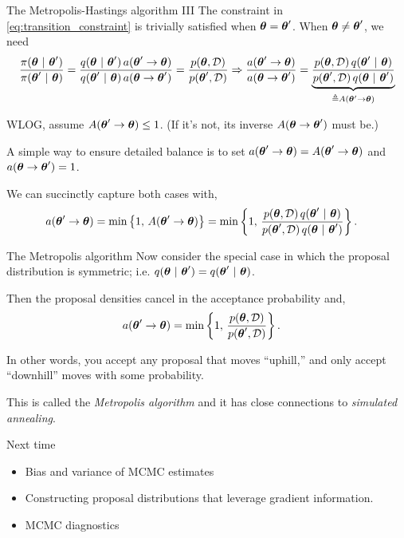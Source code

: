 \documentclass[aspectratio=169]{beamer}
\begin{document}
\begin{frame}{The Metropolis-Hastings algorithm III}
The constraint in \eqref{eq:transition_constraint} is trivially satisfied when $\boldsymbol{\theta} = \boldsymbol{\theta}'$. When $\boldsymbol{\theta} \neq \boldsymbol{\theta}'$, we need
\begin{multline}
    \frac{\pi(\boldsymbol{\theta} ~\vert~ \boldsymbol{\theta}')}{\pi(\boldsymbol{\theta}' ~\vert~ \boldsymbol{\theta})}
    = 
    \frac{q(\boldsymbol{\theta} ~\vert~ \boldsymbol{\theta}') \, a(\boldsymbol{\theta}' \to \boldsymbol{\theta})}{q(\boldsymbol{\theta}' ~\vert~ \boldsymbol{\theta}) \, a(\boldsymbol{\theta} \to \boldsymbol{\theta}')}
    = 
    \frac{p(\boldsymbol{\theta}, \mathcal{D})}{p(\boldsymbol{\theta}',  \mathcal{D})}
    \Rightarrow
    \frac{a(\boldsymbol{\theta}' \to \boldsymbol{\theta})}{a(\boldsymbol{\theta} \to \boldsymbol{\theta}')}
    = 
    \underbrace{\frac{p(\boldsymbol{\theta}, \mathcal{D}) \, q(\boldsymbol{\theta}' ~\vert~ \boldsymbol{\theta})}{p(\boldsymbol{\theta}',  \mathcal{D}) \, q(\boldsymbol{\theta} ~\vert~ \boldsymbol{\theta}') }}_{\triangleq A(\boldsymbol{\theta}' \to \boldsymbol{\theta})}
\end{multline}

WLOG, assume $ A(\boldsymbol{\theta}' \to \boldsymbol{\theta}) \leq 1$. (If it's not, its inverse $A(\boldsymbol{\theta} \to \boldsymbol{\theta}')$ must be.) 

A simple way to ensure detailed balance is to set $a(\boldsymbol{\theta}' \to \boldsymbol{\theta}) = A(\boldsymbol{\theta}' \to \boldsymbol{\theta})$ and $a(\boldsymbol{\theta} \to \boldsymbol{\theta}') = 1$. 

We can succinctly capture both cases with,
\begin{align}
    a(\boldsymbol{\theta}' \to \boldsymbol{\theta}) &= 
    \min \left\{1, \, A(\boldsymbol{\theta}' \to \boldsymbol{\theta}) \right \} = 
    \min \left\{1, \, \frac{p(\boldsymbol{\theta}, \mathcal{D}) \, q(\boldsymbol{\theta}' ~\vert~ \boldsymbol{\theta})}{p(\boldsymbol{\theta}',  \mathcal{D}) \, q(\boldsymbol{\theta} ~\vert~ \boldsymbol{\theta}')} \right \}.
\end{align}

\end{frame} 

\begin{frame}{The Metropolis algorithm}
    Now consider the special case in which the proposal distribution is symmetric; i.e. $q(\boldsymbol{\theta} ~\vert~ \boldsymbol{\theta}') = q(\boldsymbol{\theta}' ~\vert~ \boldsymbol{\theta})$.
    
    Then the proposal densities cancel in the acceptance probability and,
    \begin{align}
    a(\boldsymbol{\theta}' \to \boldsymbol{\theta}) &= 
        \min \left\{1, \, \frac{p(\boldsymbol{\theta}, \mathcal{D})}{p(\boldsymbol{\theta}',  \mathcal{D})} \right \}.
    \end{align}

    In other words, you accept any proposal that moves ``uphill,'' and only accept ``downhill'' moves with some probability. 
    
    This is called the \textit{Metropolis algorithm} and it has close connections to \textit{simulated annealing}.
\end{frame}

\begin{frame}{Next time}
    
    \begin{itemize}
        \item Bias and variance of MCMC estimates
        
        \item Constructing proposal distributions that leverage gradient information.
        
        \item MCMC diagnostics
        
    \end{itemize}
    
\end{frame}
\end{document}
